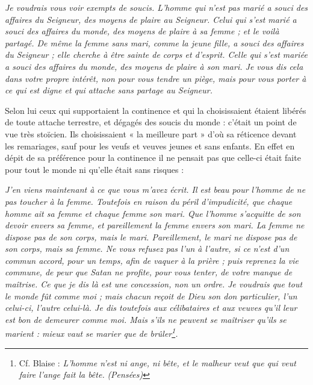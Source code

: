 \begin{displayquote}[I~Cor~7,~32-35]
\emph{Je voudrais vous voir exempts de soucis. L'homme qui n'est pas marié a souci des affaires du Seigneur, des moyens de plaire au Seigneur. Celui qui s'est marié a souci des affaires du monde, des moyens de plaire à sa femme ; et le voilà partagé. De même la femme sans mari, comme la jeune fille, a souci des affaires du Seigneur ; elle cherche à être sainte de corps et d'esprit. Celle qui s'est mariée a souci des affaires du monde, des moyens de plaire à son mari. Je vous dis cela dans votre propre intérêt, non pour vous tendre un piège, mais pour vous porter à ce qui est digne et qui attache sans partage au Seigneur.}
\end{displayquote}

 Selon lui ceux qui supportaient la continence et qui la choisissaient étaient libérés de toute attache terrestre, et dégagés des soucis du monde : c'était un point de vue très stoïcien. Ils choisissaient « la meilleure part » d'où sa réticence devant les remariages, sauf pour les veufs et veuves jeunes et sans enfants. En effet en dépit de sa préférence pour la continence il ne pensait pas que celle-ci était faite pour tout le monde ni qu'elle était sans risques :

\begin{displayquote}[I Cor 7, 8-9]
\emph{J'en viens maintenant à ce que vous m'avez écrit. Il est beau pour l'homme de ne pas toucher à la femme. Toutefois en raison du péril d'impudicité, que chaque homme ait sa femme et chaque femme son mari. Que l'homme s'acquitte de son devoir envers sa femme, et pareillement la femme envers son mari. La femme ne dispose pas de son corps, mais le mari. Pareillement, le mari ne dispose pas de son corps, mais sa femme. Ne vous refusez pas l'un à l'autre, si ce n'est d'un commun accord, pour un temps, afin de vaquer à la prière ; puis reprenez la vie commune, de peur que Satan ne profite, pour vous tenter, de votre manque de maîtrise. Ce que je dis là est une concession, non un ordre. Je voudrais que tout le monde fût comme moi ; mais chacun reçoit de Dieu son don particulier, l'un celui-ci, l'autre celui-là. Je dis toutefois aux célibataires et aux veuves qu'il leur est bon de demeurer comme moi. Mais s'ils ne peuvent se maîtriser qu'ils se marient : mieux vaut se marier que de brûler\footnote{Cf. Blaise  : \emph{L'homme n'est ni ange, ni bête, et le malheur veut que qui veut faire l'ange fait la bête.} \emph{(Pensées)}}.}
\end{displayquote}

